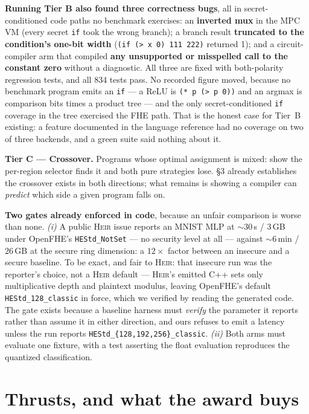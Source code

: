 \documentclass[10pt]{article}
\newcommand{\heir}{\textsc{Heir}}
\begin{document}
\medskip
\noindent\textbf{Running Tier B also found three correctness bugs}, all in
secret-conditioned code paths no benchmark exercises: an \textbf{inverted mux}
in the MPC VM (every secret \texttt{if} took the wrong branch); a branch result
\textbf{truncated to the condition's one-bit width} (\texttt{(if (> x 0) 111
222)} returned 1); and a circuit-compiler arm that compiled \textbf{any
unsupported or misspelled call to the constant zero} without a diagnostic. All
three are fixed with both-polarity regression tests, and all 834 tests pass. No
recorded figure moved, because no benchmark program emits an \texttt{if} --- a
ReLU is \texttt{(* p (> p 0))} and an argmax is comparison bits times a product
tree --- and the only secret-conditioned \texttt{if} coverage in the tree
exercised the FHE path. That is the honest case for Tier~B existing: a feature
documented in the language reference had no coverage on two of three backends,
and a green suite said nothing about it.

\medskip
\noindent\textbf{Tier C --- Crossover.} Programs whose optimal assignment is
mixed: show the per-region selector finds it and both pure strategies lose. §3
already establishes the crossover exists in both directions; what remains is
showing a compiler can \emph{predict} which side a given program falls on.

\noindent\textbf{Two gates already enforced in code}, because an unfair
comparison is worse than none. \emph{(i)} A public \heir{} issue reports an MNIST
MLP at ${\sim}30$\,s / 3\,GB under OpenFHE's \texttt{HEStd\_NotSet} --- no
security level at all --- against ${\sim}6$\,min / 26\,GB at the secure ring
dimension: a $12\times$ factor between an insecure and a secure baseline. To be
exact, and fair to \heir{}: that insecure run was the reporter's choice, not a
\heir{} default --- \heir{}'s emitted C++ sets only multiplicative depth and
plaintext modulus, leaving OpenFHE's default \texttt{HEStd\_128\_classic} in
force, which we verified by reading the generated code. The gate exists because a
baseline harness must \emph{verify} the parameter it reports rather than assume
it in either direction, and ours refuses to emit a latency unless the run reports
\texttt{HEStd\_\{128,192,256\}\_classic}. \emph{(ii)} Both arms must evaluate one
fixture, with a test asserting the float evaluation reproduces the quantized
classification.

\section{Thrusts, and what the award buys}
\end{document}
